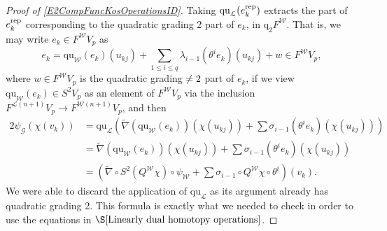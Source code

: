 \documentclass[11pt]{amsart} \renewcommand{\baselinestretch}{1.2}
\theoremstyle{plain}
\theoremstyle{definition}
\renewcommand{\to}{\longrightarrow}
\newcommand{\scrG}{\mathscr{G}}
\newcommand{\calL}{\mathcal{L}}
\newcommand{\calw}{\mathcal{W}}
\newcommand{\call}{\mathcal{L}}
\newcommand{\BSW}{{\scrG}}
\newcommand{\quadratic}{\mathrm{qu}}
\newcommand{\quadgrad}[1]{\mathrm{q}_{#1}}
\begin{document}
\begin{Operations in composite functor spectral sequences}
\begin{proof}[Proof of \ref{E2CompFuncKosOperationsID}]
Taking $\quadratic_{\call}(e_{k}^\textup{rep})$ extracts the part of $e_{k}^\textup{rep}$ corresponding to the quadratic grading 2 part of $e_{k}$, in $\quadgrad{2}F^{\calw}$. That is, we may write $e_{k}\in F^{\calw}V_p$ as
\[e_{k}=\quadratic_{\calw}(e_k)(u_{kj})+\textstyle\sum_{1\leq i\leq q} \lambda_{i-1}(\theta^ie_k)(u_{kj}) + w\in F^{\calw}V_p,\]
where $w\in F^{\calw}V_p$ is the quadratic grading$\makebox[0cm][l]{}\neq2$ part of $e_{k}$, if we view $\quadratic_{\calw}(e_k)\in S^2V_p$ as an element of $F^{\calw}V_p$ via the inclusion $F^{\calL(n+1)}V_p\to F^{\calw(n+1)}V_p$, and then
\begin{alignat*}{2}
\psi_\BSW(\chi(v_k))&=\quadratic_{\calL} \left(\widetilde{\nabla}(\quadratic_{\calw}(e_k))(\chi(u_{kj}))+\sum \sigma_{i-1}(\theta^ie_k)(\chi(u_{kj}))\right)\\
&=\widetilde{\nabla}(\quadratic_{\calw}(e_k))(\chi(u_{kj}))+\sum \sigma_{i-1}(\theta^ie_k)(\chi(u_{kj}))\\
&=\left(\widetilde{\nabla}\circ S^2(Q^{\calw}\chi)\circ \psi_{\calw}+\sum\sigma_{i-1}\circ Q^{\calw}\chi\circ\theta^i\right)(v_k).
\end{alignat*}
We were able to discard the application of $\quadratic_{\calL}$ as its argument already has quadratic grading 2. This formula is exactly what we needed to check in order to use the equations in $\S\ref{Linearly dual homotopy operations}$.
\end{proof}


\end{Operations in composite functor spectral sequences}
\end{document}
